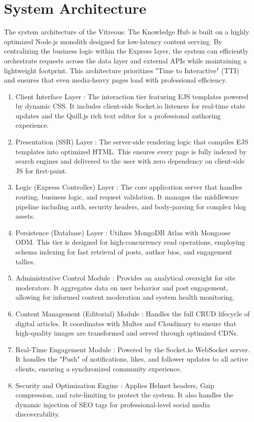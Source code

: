 \documentclass[12pt,a4paper]{report}
\begin{document}
\section{System Architecture}
The system architecture of the Vitreous: The Knowledge Hub is built on a highly optimized Node.js monolith designed for low-latency content serving. By centralizing the business logic within the Express layer, the system can efficiently orchestrate requests across the data layer and external APIs while maintaining a lightweight footprint. This architecture prioritizes "Time to Interactive" (TTI) and ensures that even media-heavy pages load with professional efficiency.
\begin{enumerate}
    
    \item Client Interface Layer :  
The interaction tier featuring EJS templates powered by dynamic CSS. It includes client-side Socket.io listeners for real-time state updates and the Quill.js rich text editor for a professional authoring experience.
\item Presentation (SSR) Layer :
The server-side rendering logic that compiles EJS templates into optimized HTML. This ensures every page is fully indexed by search engines and delivered to the user with zero dependency on client-side JS for first-paint.
\item Logic (Express Controller) Layer :
The core application server that handles routing, business logic, and request validation. It manages the middleware pipeline including auth, security headers, and body-parsing for complex blog assets.

\item Persistence (Database) Layer :
Utilizes MongoDB Atlas with Mongoose ODM. This tier is designed for high-concurrency read operations, employing schema indexing for fast retrieval of posts, author bios, and engagement tallies. 

\item Administrative Control Module :
Provides an analytical oversight for site moderators. It aggregates data on user behavior and post engagement, allowing for informed content moderation and system health monitoring.

\item Content Management (Editorial) Module :
Handles the full CRUD lifecycle of digital articles. It coordinates with Multer and Cloudinary to ensure that high-quality images are transformed and served through optimized CDNs.

\item Real-Time Engagement Module :
Powered by the Socket.io WebSocket server. It handles the "Push" of notifications, likes, and follower updates to all active clients, ensuring a synchronized community experience.

\item Security and Optimization Engine :
Applies Helmet headers, Gzip compression, and rate-limiting to protect the system. It also handles the dynamic injection of SEO tags for professional-level social media discoverability.
\end{enumerate}
\end{document}
